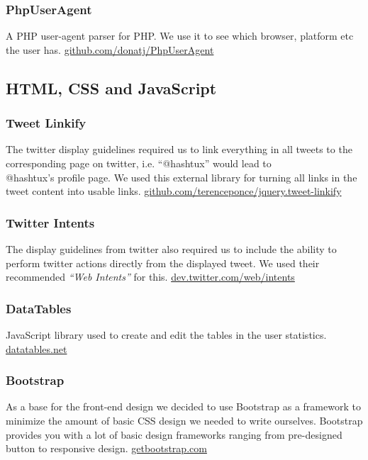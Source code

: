 \subsubsection{PhpUserAgent}
A PHP user-agent parser for PHP. We use it to see which browser, platform etc
the user has. \newline
\href{https://github.com/donatj/PhpUserAgent}{github.com/donatj/PhpUserAgent}

\subsection{HTML, CSS and JavaScript}
\subsubsection{Tweet Linkify}
The twitter display guidelines required us to link everything in all tweets to
the corresponding page on twitter, i.e. ``@hashtux'' would lead to\\  @hashtux's
profile page. We used this external library for turning all links in the tweet
content into usable links. \newline
\href{https://github.com/terenceponce/jquery.tweet-linkify}
   {github.com/terenceponce/jquery.tweet-linkify}
\subsubsection{Twitter Intents}
The display guidelines from twitter also required us to include the ability to
perform twitter actions directly from the displayed tweet. We used their
recommended \textit{``Web Intents''} for this. \newline
\href{https://dev.twitter.com/web/intents}{dev.twitter.com/web/intents}
\subsubsection{DataTables}
JavaScript library used to create and edit the tables in the user statistics.
\newline
\href{https://www.datatables.net/}{datatables.net}
\subsubsection{Bootstrap}
As a base for the front-end design we decided to use Bootstrap as a framework to
minimize the amount of basic CSS design we needed to write ourselves. Bootstrap
provides you with a lot of basic design frameworks ranging from pre-designed
button to responsive design. \newline
\href{http://getbootstrap.com/}{getbootstrap.com}